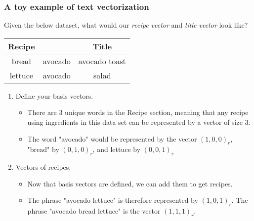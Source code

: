 \documentclass{beamer}
\begin{document}
\begin{frame}
	\frametitle{A toy example of text vectorization}
	Given the below dataset, what would our \textit{recipe vector} and \textit{title vector} look like?
	\begin{center}
		\begin{tabular}{ |c c | c|}
			\hline
			Recipe & & Title \\
			\hline\hline
			bread & avocado & avocado toast \\
			lettuce & avocado & salad \\		
			\hline
		\end{tabular}
	\end{center}

	\begin{enumerate}
	
		\item Define your basis vectors.
		\begin{itemize}
			\item There are 3 unique words in the Recipe section,
				meaning that any recipe using ingredients in
				this data set can be represented by a vector of
				size 3.
			\item The word "avocado" would be represented by the vector $(1,0,0)_r$, 
				"bread" by $(0,1,0)_r$, and lettuce by $(0,0,1)_r$
		\end{itemize}
		\item Vectors of recipes.
		\begin{itemize}
			\item Now that basis vectors are defined, we can add them to get recipes.
			\item The phrase "avocado lettuce" is therefore represented by $(1,0,1)_r$.
			\itme The phrase "avocado bread lettuce" is the vector $(1,1,1)_r$.
		\end{itemize}

	\end{enumerate}
\end{frame}
\end{document}
